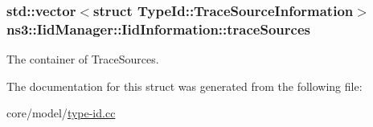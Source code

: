 \subsubsection[{\texorpdfstring{trace\+Sources}{traceSources}}]{\setlength{\rightskip}{0pt plus 5cm}std\+::vector$<$struct {\bf Type\+Id\+::\+Trace\+Source\+Information}$>$ ns3\+::\+Iid\+Manager\+::\+Iid\+Information\+::trace\+Sources}\hypertarget{structns3_1_1IidManager_1_1IidInformation_ac00222831c965ad955e5ce3b9badf86c}{}\label{structns3_1_1IidManager_1_1IidInformation_ac00222831c965ad955e5ce3b9badf86c}
The container of Trace\+Sources. 

The documentation for this struct was generated from the following file\+:\begin{DoxyCompactItemize}
\item 
core/model/\hyperlink{type-id_8cc}{type-\/id.\+cc}\end{DoxyCompactItemize}
